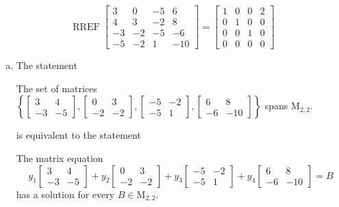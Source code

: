 \begin{exerciseAnswer} 


\[\operatorname{RREF} \left[\begin{array}{cccc}
3 & 0 & -5 & 6 \\
4 & 3 & -2 & 8 \\
-3 & -2 & -5 & -6 \\
-5 & -2 & 1 & -10
\end{array}\right] = \left[\begin{array}{cccc}
1 & 0 & 0 & 2 \\
0 & 1 & 0 & 0 \\
0 & 0 & 1 & 0 \\
0 & 0 & 0 & 0
\end{array}\right] \]


\begin{enumerate}[(a)]
\item The statement 
\begin{center}\begin{minipage}{0.8\textwidth}
 The set of matrices \( \left\{ \left[\begin{array}{cc}
3 & 4 \\
-3 & -5
\end{array}\right] , \left[\begin{array}{cc}
0 & 3 \\
-2 & -2
\end{array}\right] , \left[\begin{array}{cc}
-5 & -2 \\
-5 & 1
\end{array}\right] , \left[\begin{array}{cc}
6 & 8 \\
-6 & -10
\end{array}\right] \right\} \) spans \(\mathrm{M}_{2,2}\). 
\end{minipage}\end{center}
     is equivalent to the statement 
\begin{center}\begin{minipage}{0.8\textwidth}
 The matrix equation \[ y_{1} \left[\begin{array}{cc}
3 & 4 \\
-3 & -5
\end{array}\right] + y_{2} \left[\begin{array}{cc}
0 & 3 \\
-2 & -2
\end{array}\right] + y_{3} \left[\begin{array}{cc}
-5 & -2 \\
-5 & 1
\end{array}\right] + y_{4} \left[\begin{array}{cc}
6 & 8 \\
-6 & -10
\end{array}\right] =B\] has a solution for every \(B \in \mathrm{M}_{2,2}\). 
\end{minipage}\end{center}
    

\end{enumerate}
\end{exerciseAnswer}
